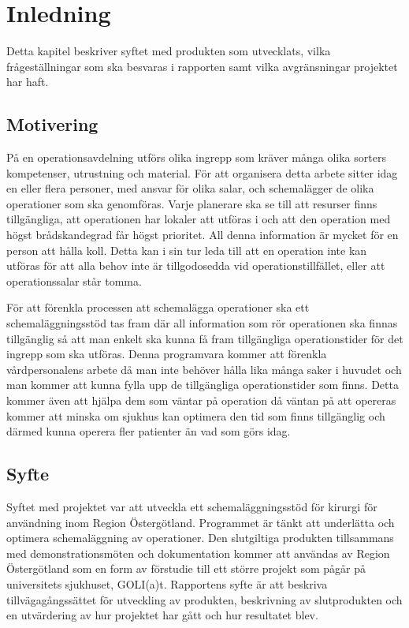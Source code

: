 \chapter{Inledning}
Detta kapitel beskriver syftet med produkten som utvecklats, vilka frågeställningar som ska besvaras i rapporten samt vilka avgränsningar projektet har haft.

\section{Motivering}
På en operationsavdelning utförs olika ingrepp som kräver många olika sorters kompetenser, utrustning och material. För att organisera detta arbete sitter
idag en eller flera personer, med ansvar för olika salar, och schemalägger de olika operationer som ska genomföras. Varje planerare ska se till att
resurser finns tillgängliga, att operationen har lokaler att utföras i och att den operation med högst brådskandegrad får högst prioritet. All denna information är
mycket för en person att hålla koll. Detta kan i sin tur leda till att en operation inte kan utföras för att alla behov inte är tillgodosedda vid operationstillfället,
eller att operationssalar står tomma.

För att förenkla processen att schemalägga operationer ska ett schemaläggningsstöd tas fram där all information som rör operationen ska finnas
tillgänglig så att man enkelt ska kunna få fram tillgängliga operationstider för det ingrepp som ska utföras. Denna programvara kommer att förenkla
vårdpersonalens arbete då man inte behöver hålla lika många saker i huvudet och man kommer att kunna fylla upp de tillgängliga operationstider som finns.
Detta kommer även att hjälpa dem som väntar på operation då väntan på att opereras kommer att minska om sjukhus kan optimera den tid som finns tillgänglig och
därmed kunna operera fler patienter än vad som görs idag.

\section{Syfte}\label{sec:syfte}
Syftet med projektet var att utveckla ett schemaläggningsstöd för kirurgi för användning inom Region Östergötland. Programmet är tänkt att underlätta och optimera schemaläggning av operationer. Den slutgiltiga produkten tillsammans med demonstrationsmöten och dokumentation kommer att användas av Region Östergötland som en form av förstudie till ett större projekt som pågår på universitets sjukhuset, GOLI(a)t. \cite{goliat} Rapportens syfte är att beskriva tillvägagångssättet för utveckling av produkten, beskrivning av slutprodukten och en utvärdering av hur projektet har gått och hur resultatet blev.

